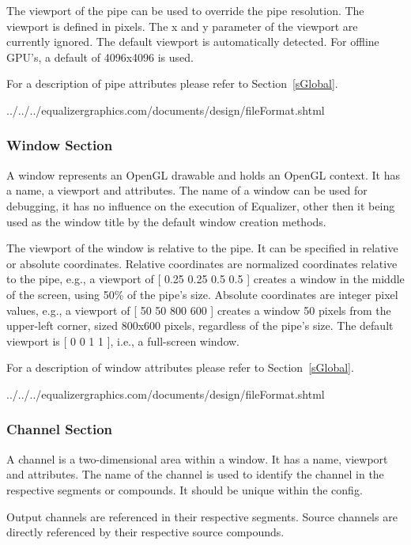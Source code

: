 \documentclass[10pt,a4]{scrartcl}
\newcommand{\sref}[1]{Section~\ref{#1}}
\begin{document}
The viewport of the pipe can be used to override the pipe
resolution. The viewport is defined in pixels. The x and y parameter of
the viewport are currently ignored. The default viewport is
automatically detected. For offline GPU's, a default of 4096x4096 is
used.

For a description of pipe attributes please refer to \sref{sGlobal}.

{\footnotesize
  {../../../equalizergraphics.com/documents/design/fileFormat.shtml}}

\subsubsection{Window Section}

A window represents an OpenGL drawable and holds an OpenGL context. It
has a name, a viewport and attributes. The name of a window can be used
for debugging, it has no influence on the execution of Equalizer, other
then it being used as the window title by the default window creation
methods.

The viewport of the window is relative to the pipe. It can be specified in
relative or absolute coordinates. Relative coordinates are normalized
coordinates relative to the pipe, e.g., a viewport of \textsf{[ 0.25 0.25 0.5
    0.5 ]} creates a window in the middle of the screen, using 50\% of the
pipe's size. Absolute coordinates are integer pixel values, e.g., a viewport of
\textsf{[ 50 50 800 600 ]} creates a window 50 pixels from the upper-left
corner, sized 800x600 pixels, regardless of the pipe's size. The default
viewport is \textsf{[ 0 0 1 1 ]}, i.e., a full-screen window.

For a description of window attributes please refer to \sref{sGlobal}.

{\footnotesize
  {../../../equalizergraphics.com/documents/design/fileFormat.shtml}}

\subsubsection{Channel Section}

A channel is a two-dimensional area within a window. It has a name,
viewport and attributes. The name of the channel is used to identify the
channel in the respective segments or compounds. It should be unique
within the config.

Output channels are referenced in their respective segments. Source channels are
directly referenced by their respective source compounds.
\end{document}
